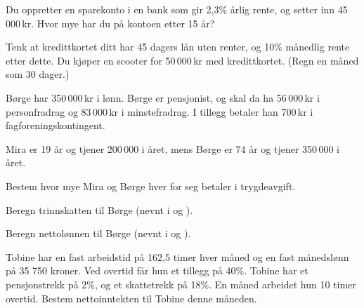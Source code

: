 \newpage
{}
Du oppretter en sparekonto i en bank som gir 2,3\% årlig rente, og setter inn 45\,000\,kr. Hvor mye har du på kontoen etter 15 år?

Tenk at kredittkortet ditt har 45 dagers lån uten renter, og 10\% månedlig rente etter dette. Du kjøper en scooter for 50\,000\,kr med kredittkortet. (Regn en måned som 30 dager.)\os
{}



\nes

Børge har 350\,000\,kr i lønn. Børge er pensjonist, og skal da ha 56\,000\,kr i personfradrag og 83\,000\,kr i minstefradrag. I tillegg betaler han 700\,kr i fagforeningskontingent. \os
{}

Mira er 19 år og tjener 200\,000 i året, mens Børge er 74 år og tjener 350\,000 i året. \os

Bestem hvor mye Mira og Børge hver for seg betaler i trygdeavgift.

Beregn trinnskatten til Børge (nevnt i  og ).

Beregn nettolønnen til Børge (nevnt i  og ).

Tobine har en fast arbeidstid på 162,5 timer hver måned og en fast månedslønn på
35 750 kroner.
Ved overtid får hun et tillegg på 40\%.
Tobine har et pensjonstrekk på 2\%, og et skattetrekk på 18\%.
En måned arbeidet hun 10 timer overtid.
Bestem nettoinntekten til Tobine denne måneden.

\nes

